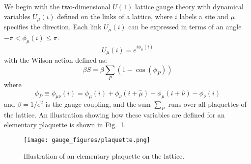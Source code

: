 \documentclass[../main.tex]{subfiles}
\begin{document}
%

We begin with the two-dimensional $U{(1)}$ lattice gauge theory with dynamical variables $U_{\mu}{(i)}$
defined on the links of a lattice, where $i$ labels a site and $\mu$ specifies the direction.
%
%
Each link $U_{\mu}{(i)}$ can be expressed in terms of an angle $-\pi < \phi_{\mu}{(i)} \leq \pi$.
%
\begin{equation}
    U_{\mu}{(i)} = e^{i\phi_{\mu}{(i)}}
    \label{eq:link_variable}
\end{equation}
%
with the Wilson action defined as:
%
\begin{equation}
    \beta S = \beta \sum_{P}{(1 - \cos{(\phi_{P})})}
    \label{eq:wilson_action}
\end{equation}
%
where
%
\begin{equation}
    \phi_{P} \equiv \phi_{\mu\nu}(i) = 
        \phi_{\mu}{(i)} + \phi_{\nu}{(i + \hat{\mu})} 
        - \phi_{\mu}{(i + \hat{\nu})} - \phi_{\nu}{(i)}
    \label{eq:phi_plaquette}
\end{equation}
and $\beta = 1/e^{2}$ is the gauge coupling, and the sum $\sum_{P}$ runs over all plaquettes of the lattice.
%
An illustration showing how these variables are defined for an elementary plaquette is shown in
Fig.~\ref{fig:plaquette}.
%
\begin{figure}[htpb]
  \centering
  \texttt{[image: gauge\_figures/plaquette.png]}
  \caption{Illustration of an elementary plaquette on the lattice.}%
\label{fig:plaquette}
\end{figure}
\end{document}

